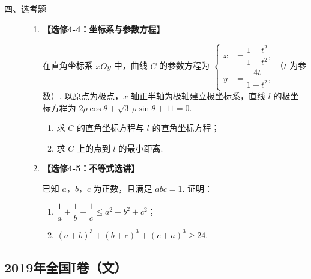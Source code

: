 \begin{description}

    \item[四、选考题]

    \begin{enumerate}[leftmargin=5pt]

      \addtocounter{enumi}{+21}

        \item \textbf{【选修4-4：坐标系与参数方程】}

在直角坐标系 \(xOy\) 中，曲线 \(C\) 的参数方程为 \(\left\{\begin{aligned}x&=\dfrac{1-t^2}{1+t^2},\\y&=\dfrac{4t}{1+t^2},\end{aligned}\right.\)（\(t\) 为参数）. 以原点为极点，\(x\) 轴正半轴为极轴建立极坐标系，直线 \(l\) 的极坐标方程为 \(2\rho\cos\theta+\sqrt3\,\rho\sin\theta+11=0\).

\begin{enumerate}
\item 求 \(C\) 的直角坐标方程与 \(l\) 的直角坐标方程；

\item 求 \(C\) 上的点到 \(l\) 的最小距离.
\end{enumerate}

        \item \textbf{【选修4-5：不等式选讲】}

已知 \(a\)，\(b\)，\(c\) 为正数，且满足 \(abc=1\). 证明：

\begin{enumerate}
\item \(\dfrac{1}{a}+\dfrac{1}{b}+\dfrac{1}{c}\le a^2+b^2+c^2\)；

\item \((a+b)^3+(b+c)^3+(c+a)^3\ge24\).
\end{enumerate}

    \end{enumerate}

\end{description}


\subsection{2019年全国I卷（文）}\label{gk:2019年全国I卷（文）}

